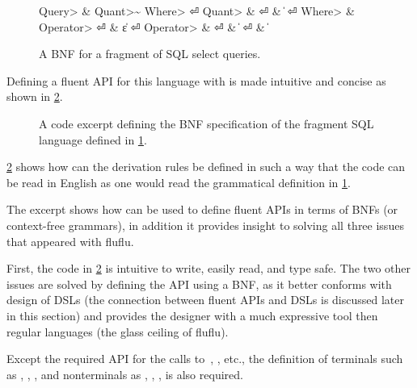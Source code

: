 \begin{figure}[ht]
  \caption{\label{figure:sql-bnf}
    A BNF for a fragment of SQL select queries.
  }
  \begin{Grammar}
    \begin{aligned}
      \<Query>    & \Derives {} \<Quant>\~ \<Where> \hfill⏎
      \<Quant>    & \Derives {} \hfill⏎
                  & \|  \hfill⏎
      \<Where>    & \Derives {}  \<Operator> \hfill⏎
                  & \|ε \hfill⏎
      \<Operator> & \Derives {}\hfill⏎
                  & \|  \hfill⏎
                  & \| \hfill
    \end{aligned}
  \end{Grammar}
\end{figure}

Defining a fluent API for this language with \Fajita is made
intuitive and concise as shown in \cref{figure:sql-bnf-java}.

\begin{figure}[ht]
  \caption{\label{figure:sql-bnf-java}
    A \Java code excerpt defining the BNF specification of the fragment SQL
    language defined in \cref{figure:sql-bnf}.}
\end{figure}

\cref{figure:sql-bnf-java} shows how can the derivation rules be defined in
such a way that the code can be read in English as one would read the
grammatical definition in \cref{figure:sql-bnf}.

The excerpt shows how can \Fajita be used to define fluent
APIs in terms of BNFs (or context-free grammars), in addition it provides
insight to solving all three issues that appeared with fluflu.

First, the code in \cref{figure:sql-bnf-java} is intuitive to write, easily
read, and type safe. The two other issues are solved by defining the API using
a BNF, as it better conforms with design of DSLs (the connection between fluent
APIs and DSLs is discussed later in this section) and provides the designer
with a much expressive tool then regular languages (the glass ceiling of
fluflu).

Except the required API for the calls to~,
,  etc., the definition of terminals such as
, , , and nonterminals as ,
, , is also required.

